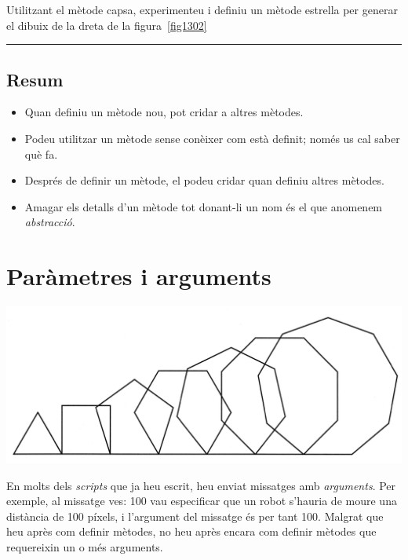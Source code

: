 \begin{center}
\colorbox{black}{}
\end{center}
{\small
\noindent
Utilitzant el mètode \textsf{capsa}, experimenteu i definiu un mètode \textsf{estrella} per generar el dibuix de la dreta de la figura~\ref{fig1302}}\\
\noindent
\rule{\textwidth}{3pt}

\section{Resum}

\begin{itemize}
\item Quan definiu un mètode nou, pot cridar a altres mètodes.
\item Podeu utilitzar un mètode sense conèixer com està definit; només us cal saber què fa.
\item Després de definir un mètode, el podeu cridar quan definiu altres mètodes.
\item Amagar els detalls d'un mètode tot donant-li un nom és el que anomenem \emph{abstracció}.
\end{itemize}

\chapter{Paràmetres i arguments}
\label{cap14}

\includegraphics[scale=0.13]{Imatges/figura14-0.jpg}

En molts dels \emph{scripts} que ja heu escrit, heu enviat missatges amb \emph{arguments}. Per exemple, al missatge \textsf{ves: 100} vau especificar que un robot s'hauria de moure una distància de 100 píxels, i l'argument del missatge és per tant \textsf{100}. Malgrat que heu après com definir mètodes, no heu après encara com definir mètodes que requereixin un o més arguments.

